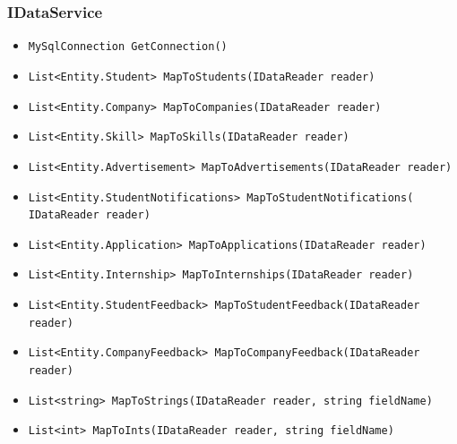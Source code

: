 \subsubsection{IDataService}
\begin{itemize}
    \item \verb|MySqlConnection GetConnection()|
    \item \verb|List<Entity.Student> MapToStudents(IDataReader reader)|
    \item \verb|List<Entity.Company> MapToCompanies(IDataReader reader)|
    \item \verb|List<Entity.Skill> MapToSkills(IDataReader reader)|
    \item \verb|List<Entity.Advertisement> MapToAdvertisements(IDataReader reader)|
    \item \verb|List<Entity.StudentNotifications> MapToStudentNotifications(| \\ \makebox[10em][l]{} \verb|IDataReader reader)|
    \item \verb|List<Entity.Application> MapToApplications(IDataReader reader)|
    \item \verb|List<Entity.Internship> MapToInternships(IDataReader reader)|
    \item \verb|List<Entity.StudentFeedback> MapToStudentFeedback(IDataReader reader)|
    \item \verb|List<Entity.CompanyFeedback> MapToCompanyFeedback(IDataReader reader)|
    \item \verb|List<string> MapToStrings(IDataReader reader, string fieldName)|
    \item \verb|List<int> MapToInts(IDataReader reader, string fieldName)|
\end{itemize}

